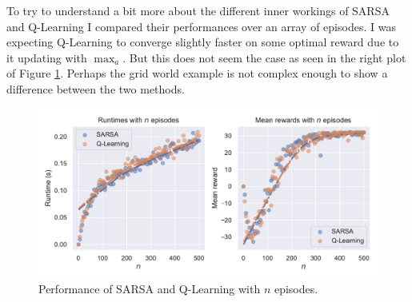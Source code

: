 \documentclass[]{scrartcl}
\begin{document}
To try to understand a bit more about the different inner workings of SARSA and Q-Learning I compared their performances over an array of episodes. I was expecting Q-Learning to converge slightly faster on some optimal reward due to it updating with $\max_a$. But this does not seem the case as seen in the right plot of Figure \ref{fig:3-3}. Perhaps the grid world example is not complex enough to show a difference between the two methods.

\begin{figure}[H]
	\centering
	\includegraphics[width=0.7\linewidth]{3-3.pdf}
	\caption{Performance of SARSA and Q-Learning with $n$ episodes.}
	\label{fig:3-3}
\end{figure}
\end{document}

